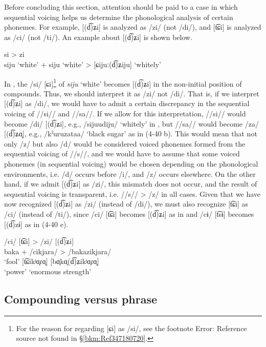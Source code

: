   Before concluding this section, attention should be paid to a case in which sequential voicing helps us determine the phonological analysis of certain phonemes. For example, [(d͡)ʑi] is analyzed as /zi/ (not /di/), and [t͡ɕi] is analyzed as /ci/ (not /ti/). An example about [(d͡)ʑi] is shown below.

\ea  si > zi   \label{ex:4.43}\\
  siju  ‘white’  +  siju  ‘white’  >  [ɕijuː(d͡)ʑiju]  ‘whitely’
\z
  
In , the /si/ [ɕi]\footnote{For the reason for regarding [ɕi] as /si/, see the footnote Error: Reference source not found in §\ref{bkm:Ref347180720}.} of \textit{siju} ‘white’ becomes [(d͡)ʑi] in the non-initial position of compounds. Thus, we should interpret it as /zi/ not /di/. That is, if we interpret [(d͡)ʑi] as /di/, we would have to admit a certain discrepancy in the sequential voicing of //si// and //sa//. If we allow for this interpretation, //si// would become /di/ [(d͡)ʑi], e.g., /sijuudiju/ ‘whitely’ in , but //sa// would become /za/ [(d͡)ʑɑ̟], e.g., /kˀuruzataa/ ‘black sugar’ as in (4-40 b). This would mean that not only /z/ but also /d/ would be considered voiced phonemes formed from the sequential voicing of //s//, and we would have to assume that some voiced phonemes (in sequential voicing) would be chosen depending on the phonological environments, i.e. /d/ occurs before /i/, and /z/ occurs elsewhere. On the other hand, if we admit [(d͡)ʑi] as /zi/, this mismatch does not occur, and the result of sequential voicing is transparent, i.e. //s// > /z/ in all cases. Given that we have now recognized [(d͡)ʑi] as /zi/ (instead of /di/), we must also recognize [t͡ɕi] as /ci/ (instead of /ti/), since /ci/ [t͡ɕi] becomes [(d͡)ʑi] as in  and /cɨ/ [t͡sɨ] becomes [(d͡)zɨ] as in (4-40 e).

\ea  /ci/ [t͡ɕi] > /zi/ [(d͡)ʑi]   \label{ex:4.44}\\
\glll   baka    +  /cikjara/        >  /bakazikjara/\\
        ‘fool’  {}   [t͡ɕikʲɑ̟ɾɑ̟]    {}     [bɑ̟kɑ̟(d͡)ʑikʲɑ̟ɾɑ̟]\\
           {}     {}  ‘power’          {}    {‘enormous strength’}\\
\z 

\subsection{Compounding versus phrase}\label{sec:4.2.4}

